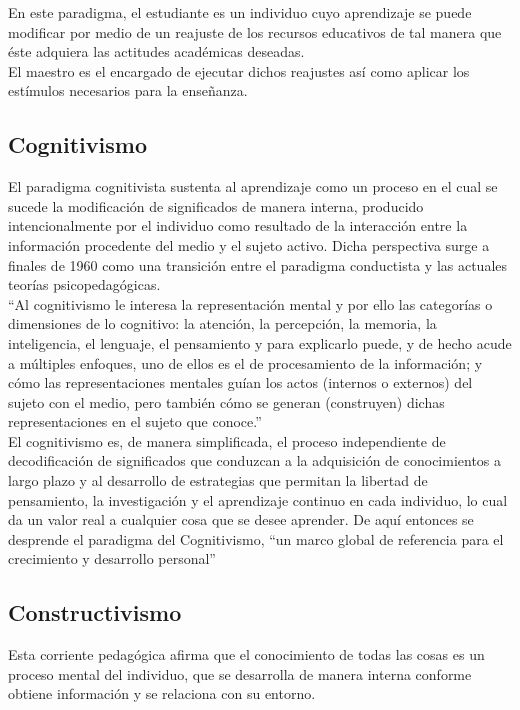 En este paradigma, el estudiante es un individuo cuyo aprendizaje se puede modificar por medio de un reajuste de los recursos educativos de tal manera que éste adquiera las actitudes académicas deseadas.\\

El maestro es el encargado de ejecutar dichos reajustes así como aplicar los estímulos necesarios para la enseñanza.

\subsection{Cognitivismo}
El paradigma cognitivista sustenta al aprendizaje como un proceso en el cual se sucede la modificación de significados de manera interna, producido intencionalmente por el individuo como resultado de la interacción entre la información procedente del medio y el sujeto activo. Dicha perspectiva surge a finales de 1960 como una transición entre el paradigma conductista y las actuales teorías psicopedagógicas.\\

``Al cognitivismo le interesa la representación mental y por ello las categorías o dimensiones de lo cognitivo: la atención, la percepción, la memoria, la inteligencia, el lenguaje, el pensamiento y para explicarlo puede, y de hecho acude a múltiples enfoques, uno de ellos es el de procesamiento de la información; y cómo las representaciones mentales guían los actos (internos o externos) del sujeto con el medio, pero también cómo se generan (construyen) dichas representaciones en el sujeto que conoce.'' \citep{Cognitivismo_Ferreiro1996}\\

El cognitivismo es, de manera simplificada, el proceso independiente de decodificación de significados que conduzcan a la adquisición de conocimientos a largo plazo y al desarrollo de estrategias que permitan la libertad de pensamiento, la investigación y el aprendizaje continuo en cada individuo, lo cual da un valor real a cualquier cosa que se desee aprender. De aquí entonces se desprende el paradigma del Cognitivismo, ``un marco global de referencia para el crecimiento y desarrollo personal'' \citep{Cognitivismo_Ferreiro1996}

\subsection{Constructivismo}
Esta corriente pedagógica afirma que el conocimiento de todas las cosas es un proceso mental del individuo, que se desarrolla de manera interna conforme obtiene información y se relaciona con su entorno.\\

